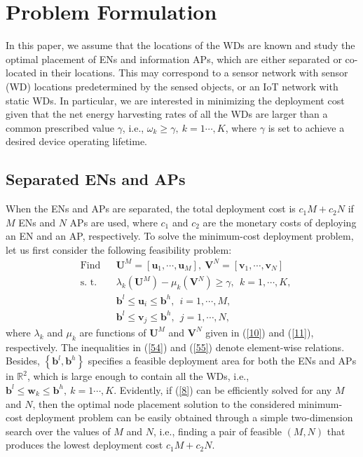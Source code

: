 \documentclass[journal, draftcls, one column, 12pt]{IEEEtran}
\begin{document}
\section{Problem Formulation}\label{sec:PrbForm}
In this paper, we assume that the locations of the WDs are known and study the optimal placement of ENs and information APs, which are either separated or co-located in their locations. This may correspond to a sensor network with sensor (WD) locations predetermined by the sensed objects, or an IoT network with static WDs. In particular, we are interested in minimizing the deployment cost given that the net energy harvesting rates of all the WDs are larger than a common prescribed value $\gamma$, i.e., $\omega_k \geq \gamma,\ k=1\cdots,K$, where $\gamma$ is set to achieve a desired device operating lifetime.

\subsection{Separated ENs and APs}
When the ENs and APs are separated, the total deployment cost is $c_1 M+ c_2 N$ if $M$ ENs and $N$ APs are used, where $c_1$ and $c_2$ are the monetary costs of deploying an EN and an AP, respectively. To solve the minimum-cost deployment problem, let us first consider the following feasibility problem:
\begin{subequations}
\label{8}
   \begin{align}
    & \text{Find} & &  \mathbf{U}^M = \left[\mathbf{u}_1,\cdots,\mathbf{u}_M\right],\ \mathbf{V}^N = \left[\mathbf{v}_1,\cdots,\mathbf{v}_N\right]\\
    & \text{s. t.}    & & \lambda_k \left(\mathbf{U}^M\right) -\mu_k\left(\mathbf{V}^N\right) \geq \gamma, \ \ k=1,\cdots,K, \label{56}\\
    & & & \mathbf{b}^l\leq \mathbf{u}_i\leq \mathbf{b}^h,\ \ i=1,\cdots,M, \label{54}\\
    & & & \mathbf{b}^l\leq \mathbf{v}_j\leq \mathbf{b}^h,\ \ j=1,\cdots,N, \label{55}
   \end{align}
\end{subequations}
where $\lambda_k$ and $\mu_k$ are functions of $\mathbf{U}^M$ and $\mathbf{V}^N$ given in (\ref{10}) and (\ref{11}), respectively. The inequalities in (\ref{54}) and (\ref{55}) denote element-wise relations. Besides, $\left\{\mathbf{b}^l,\mathbf{b}^h\right\}$ specifies a feasible deployment area for both the ENs and APs in $\mathbb{R}^2$, which is large enough to contain all the WDs, i.e., $\mathbf{b}^l \leq \mathbf{w}_k \leq \mathbf{b}^h,\ k=1\cdots,K$. Evidently, if (\ref{8}) can be efficiently solved for any $M$ and $N$, then the optimal node placement solution to the considered minimum-cost deployment problem can be easily obtained through a simple two-dimension search over the values of $M$ and $N$, i.e., finding a pair of feasible $(M,N)$ that produces the lowest deployment cost $c_1 M+ c_2 N$.
\end{document}
